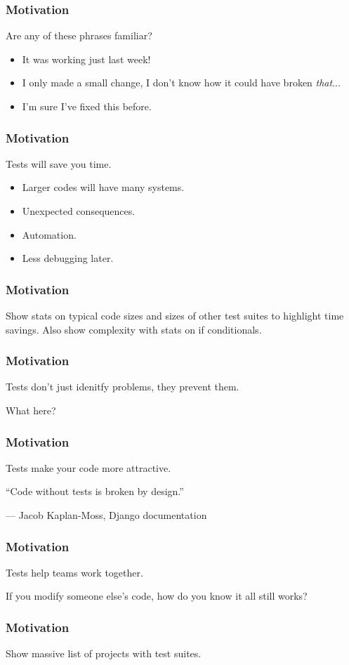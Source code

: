\begin{frame}
  \frametitle{Motivation}
  Are any of these phrases familiar?
  \begin{itemize}
    \pause
    \item It was working just last week!
    \pause
    \item I only made a small change, I don't know how it could have broken \emph{that}...
    \pause
    \item I'm sure I've fixed this before.
  \end{itemize}
\end{frame}

\begin{frame}
  \frametitle{Motivation}
  Tests will save you time.
  \begin{itemize}
    \item Larger codes will have many systems.
    \item Unexpected consequences.
    \item Automation.
    \item Less debugging later.
  \end{itemize}
\end{frame}

\begin{frame}
  \frametitle{Motivation}
  Show stats on typical code sizes and sizes of other test suites to highlight
  time savings. Also show complexity with stats on if conditionals.
\end{frame}

\begin{frame}
  \frametitle{Motivation}
  Tests don't just idenitfy problems, they prevent them.

  What here?
\end{frame}

\begin{frame}[fragile]
  \frametitle{Motivation}
  Tests make your code more attractive.
  \epigraph{``Code without tests is broken by design.''}{--- \textup{Jacob Kaplan-Moss}, Django documentation}
\end{frame}

\begin{frame}
  \frametitle{Motivation}
  Tests help teams work together.

  If you modify someone else's code, how do you know it all still works?
\end{frame}

\begin{frame}
  \frametitle{Motivation}
  Show massive list of projects with test suites.
\end{frame}
